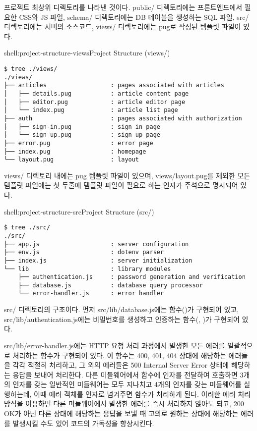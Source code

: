 \는 프로젝트 최상위 디렉토리를 나타낸 것이다. public/ 디렉토리에는 프론트엔드에서 필요한 CSS와 JS 파일, schema/ 디렉토리에는 DB 테이블을 생성하는 SQL 파일, src/ 디렉토리에는 서버의 소스코드, views/ 디렉토리에는 pug로 작성된 템플릿 파일이 있다.

\begin{shellenv}{shell:project-structure-views}{Project Structure (views/)}\begin{verbatim}
$ tree ./views/
./views/
├── articles                  : pages associated with articles
│   ├── details.pug           : article content page
│   ├── editor.pug            : article editor page
│   └── index.pug             : article list page
├── auth                      : pages associated with authorization
│   ├── sign-in.pug           : sign in page
│   └── sign-up.pug           : sign up page
├── error.pug                 : error page
├── index.pug                 : homepage
└── layout.pug                : layout
\end{verbatim}
\end{shellenv}

views/ 디렉토리 내에는 pug 템플릿 파일이 있으며, views/layout.pug를 제외한 모든 템플릿 파일에는 첫 두줄에 템플릿 파일이 필요로 하는 인자가 주석으로 명시되어 있다.

\begin{shellenv}{shell:project-structure-src}{Project Structure (src/)}\begin{verbatim}
$ tree ./src/
./src/
├── app.js                    : server configuration
├── env.js                    : dotenv parser
├── index.js                  : server initialization
└── lib                       : library modules
    ├── authentication.js     : password generation and verification
    ├── database.js           : database query processor
    └── error-handler.js      : error handler
\end{verbatim}
\end{shellenv}

\는 src/ 디렉토리의 구조이다. 먼저 src/lib/database.js에는  함수()가 구현되어 있고, src/lib/authentication.js에는 비밀번호를 생성하고 인증하는 함수(, )가 구현되어 있다.

src/lib/error-handler.js에는 HTTP 요청 처리 과정에서 발생한 모든 에러를 일괄적으로 처리하는  함수가 구현되어 있다. 이 함수는 400, 401, 404 상태에 해당하는 에러들을 각각 적절히 처리하고, 그 외의 에러들은 500 Internal Server Error 상태에 해당하는 응답을 보내어 처리한다. 다른 미들웨어에서  함수에 인자를 전달하여 호출하면 3개의 인자를 갖는 일반적인 미들웨어는 모두 지나치고 4개의 인자를 갖는 미들웨어를 실행하는데, 이때 에러 객체를 인자로 넘겨주면  함수가 처리하게 된다. 이러한 에러 처리 방식을 이용하면 다른 미들웨어에서 발생한 에러를 즉시 처리하지 않아도 되고, 200 OK가 아닌 다른 상태에 해당하는 응답을 보낼 때 고의로 원하는 상태에 해당하는 에러를 발생시킬 수도 있어 코드의 가독성을 향상시킨다.

